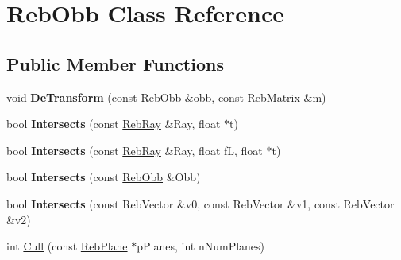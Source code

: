 \hypertarget{class_reb_obb}{}\section{Reb\+Obb Class Reference}
\label{class_reb_obb}
\subsection*{Public Member Functions}
\begin{DoxyCompactItemize}
\item 
void {\bfseries De\+Transform} (const \hyperlink{class_reb_obb}{Reb\+Obb} \&obb, const Reb\+Matrix \&m)\hypertarget{class_reb_obb_a9d8e3f0340ed159956a4b418764ac595}{}\label{class_reb_obb_a9d8e3f0340ed159956a4b418764ac595}

\item 
bool {\bfseries Intersects} (const \hyperlink{class_reb_ray}{Reb\+Ray} \&Ray, float $\ast$t)\hypertarget{class_reb_obb_ac1ecb2f5418ce04d18f33a40242cb734}{}\label{class_reb_obb_ac1ecb2f5418ce04d18f33a40242cb734}

\item 
bool {\bfseries Intersects} (const \hyperlink{class_reb_ray}{Reb\+Ray} \&Ray, float fL, float $\ast$t)\hypertarget{class_reb_obb_a714f1d2620205ea99f5c49c3a630968b}{}\label{class_reb_obb_a714f1d2620205ea99f5c49c3a630968b}

\item 
bool {\bfseries Intersects} (const \hyperlink{class_reb_obb}{Reb\+Obb} \&Obb)\hypertarget{class_reb_obb_ab217a6fc081a7f4d6d0c9d22b97d0d9e}{}\label{class_reb_obb_ab217a6fc081a7f4d6d0c9d22b97d0d9e}

\item 
bool {\bfseries Intersects} (const Reb\+Vector \&v0, const Reb\+Vector \&v1, const Reb\+Vector \&v2)\hypertarget{class_reb_obb_aa638a27c7aa77697cac8afe9df0f2822}{}\label{class_reb_obb_aa638a27c7aa77697cac8afe9df0f2822}

\item 
int \hyperlink{class_reb_obb_aa5f6e95f5d16cc3a39c84f6ce5f2b337}{Cull} (const \hyperlink{class_reb_plane}{Reb\+Plane} $\ast$p\+Planes, int n\+Num\+Planes)
\end{DoxyCompactItemize}
